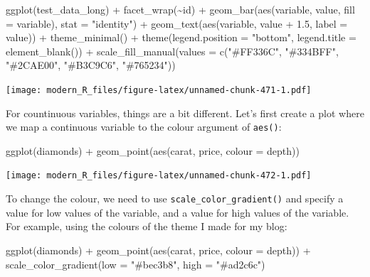 \documentclass[
]{article}
\newenvironment{Shaded}{\begin{snugshade}}{\end{snugshade}}
\newcommand{\AttributeTok}[1]{\textcolor[rgb]{0.77,0.63,0.00}{#1}}
\newcommand{\FloatTok}[1]{\textcolor[rgb]{0.00,0.00,0.81}{#1}}
\newcommand{\FunctionTok}[1]{\textcolor[rgb]{0.00,0.00,0.00}{#1}}
\newcommand{\NormalTok}[1]{#1}
\newcommand{\SpecialCharTok}[1]{\textcolor[rgb]{0.00,0.00,0.00}{#1}}
\newcommand{\StringTok}[1]{\textcolor[rgb]{0.31,0.60,0.02}{#1}}
\begin{document}
\begin{Shaded}
\begin{Highlighting}[]
\FunctionTok{ggplot}\NormalTok{(test\_data\_long) }\SpecialCharTok{+}
  \FunctionTok{facet\_wrap}\NormalTok{(}\SpecialCharTok{\textasciitilde{}}\NormalTok{id) }\SpecialCharTok{+}
  \FunctionTok{geom\_bar}\NormalTok{(}\FunctionTok{aes}\NormalTok{(variable, value, }\AttributeTok{fill =}\NormalTok{ variable), }\AttributeTok{stat =} \StringTok{"identity"}\NormalTok{) }\SpecialCharTok{+}
  \FunctionTok{geom\_text}\NormalTok{(}\FunctionTok{aes}\NormalTok{(variable, value }\SpecialCharTok{+} \FloatTok{1.5}\NormalTok{, }\AttributeTok{label =}\NormalTok{ value)) }\SpecialCharTok{+}
  \FunctionTok{theme\_minimal}\NormalTok{() }\SpecialCharTok{+}
  \FunctionTok{theme}\NormalTok{(}\AttributeTok{legend.position =} \StringTok{"bottom"}\NormalTok{, }\AttributeTok{legend.title =} \FunctionTok{element\_blank}\NormalTok{()) }\SpecialCharTok{+}
  \FunctionTok{scale\_fill\_manual}\NormalTok{(}\AttributeTok{values =} \FunctionTok{c}\NormalTok{(}\StringTok{"\#FF336C"}\NormalTok{, }\StringTok{"\#334BFF"}\NormalTok{, }\StringTok{"\#2CAE00"}\NormalTok{, }\StringTok{"\#B3C9C6"}\NormalTok{, }\StringTok{"\#765234"}\NormalTok{))}
\end{Highlighting}
\end{Shaded}

\texttt{[image: modern\_R\_files/figure-latex/unnamed-chunk-471-1.pdf]}

For countinuous variables, things are a bit different. Let's first create a plot where we map a continuous
variable to the colour argument of \texttt{aes()}:

\begin{Shaded}
\begin{Highlighting}[]
\FunctionTok{ggplot}\NormalTok{(diamonds) }\SpecialCharTok{+}
  \FunctionTok{geom\_point}\NormalTok{(}\FunctionTok{aes}\NormalTok{(carat, price, }\AttributeTok{colour =}\NormalTok{ depth))}
\end{Highlighting}
\end{Shaded}

\texttt{[image: modern\_R\_files/figure-latex/unnamed-chunk-472-1.pdf]}

To change the colour, we need to use \texttt{scale\_color\_gradient()} and specify a value for low values of the variable,
and a value for high values of the variable. For example, using the colours of the theme I made for my blog:

\begin{Shaded}
\begin{Highlighting}[]
\FunctionTok{ggplot}\NormalTok{(diamonds) }\SpecialCharTok{+}
  \FunctionTok{geom\_point}\NormalTok{(}\FunctionTok{aes}\NormalTok{(carat, price, }\AttributeTok{colour =}\NormalTok{ depth)) }\SpecialCharTok{+}
  \FunctionTok{scale\_color\_gradient}\NormalTok{(}\AttributeTok{low =} \StringTok{"\#bec3b8"}\NormalTok{, }\AttributeTok{high =} \StringTok{"\#ad2c6c"}\NormalTok{)}
\end{Highlighting}
\end{Shaded}
\end{document}
